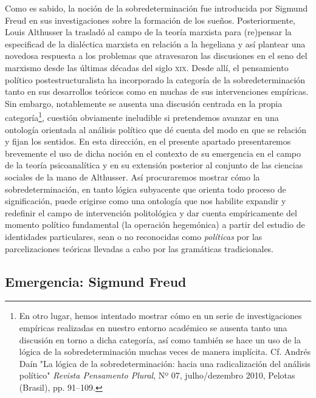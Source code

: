 \documentclass{book}
\begin{document}
Como es sabido, la noción de la sobredeterminación fue introducida por
Sigmund Freud en sus investigaciones sobre la formación de los sueños.
Posteriormente, Louis Althusser la trasladó al campo de la teoría
marxista para (re)pensar la especificad de la dialéctica marxista en
relación a la hegeliana y así plantear una novedosa respuesta a los
problemas que atravesaron las discusiones en el seno del marxismo desde
las últimas décadas del siglo \textsc{xix}. Desde allí, el pensamiento
político postestructuralista ha incorporado la categoría de la
sobredeterminación tanto en sus desarrollos teóricos como en muchas de
sus intervenciones empíricas. Sin embargo, notablemente se ausenta una
discusión centrada en la propia categoría\footnote{En otro lugar, hemos
  intentado mostrar cómo en un serie de investigaciones empíricas
  realizadas en nuestro entorno académico se ausenta tanto una discusión
  en torno a dicha categoría, así como también se hace un uso de la
  lógica de la sobredeterminación muchas veces de manera implícita. Cf.
  Andrés Daín "La lógica de la sobredeterminación: hacia una
  radicalización del análisis político" \emph{Revista Pensamento
  Plural}, Nº 07, julho/dezembro 2010, Pelotas (Brasil), pp. 91--109.},
cuestión obviamente ineludible si pretendemos avanzar en una ontología
orientada al análisis político que dé cuenta del modo en que se relación
y fijan los sentidos. En esta dirección, en el presente apartado
presentaremos brevemente el uso de dicha noción en el contexto de su
emergencia en el campo de la teoría psicoanalítica y en su extensión
posterior al conjunto de las ciencias sociales de la mano de Althusser.
Así procuraremos mostrar cómo la sobredeterminación, en tanto lógica
subyacente que orienta todo proceso de significación, puede erigirse
como una ontología que nos habilite expandir y redefinir el campo de
intervención politológica y dar cuenta empíricamente del momento
político fundamental (la operación hegemónica) a partir del estudio de
identidades particulares, sean o no reconocidas como \emph{políticas}
por las parcelizaciones teóricas llevadas a cabo por las gramáticas
tradicionales.

\hypertarget{emergencia-sigmund-freud}{%
\subsection{Emergencia: Sigmund Freud}\label{emergencia-sigmund-freud}}
\end{document}
